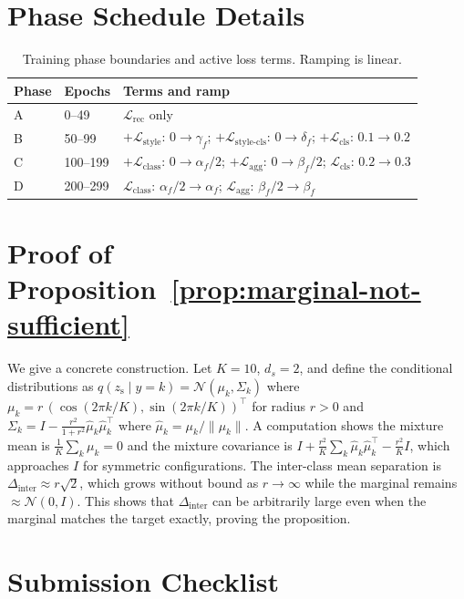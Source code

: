 \documentclass[10pt]{article}
\newcommand{\zs}{z_{\mathrm{s}}}
\begin{document}
\section{Phase Schedule Details}
\label{app:schedule}

\begin{table}[h]
\centering
\caption{Training phase boundaries and active loss terms. Ramping is linear.}
\label{tab:phases}
\begin{tabular}{lll}
\toprule
Phase & Epochs & Terms and ramp \\
\midrule
A & 0--49 &
  $\mathcal{L}_{\mathrm{rec}}$ only \\
B & 50--99 &
  $+\mathcal{L}_{\mathrm{style}}$: $0\to\gamma_f$;
  $+\mathcal{L}_{\mathrm{style\text{-}cls}}$: $0\to\delta_f$;
  $+\mathcal{L}_{\mathrm{cls}}$: $0.1\to0.2$ \\
C & 100--199 &
  $+\mathcal{L}_{\mathrm{class}}$: $0\to\alpha_f/2$;
  $+\mathcal{L}_{\mathrm{agg}}$: $0\to\beta_f/2$;
  $\mathcal{L}_{\mathrm{cls}}$: $0.2\to0.3$ \\
D & 200--299 &
  $\mathcal{L}_{\mathrm{class}}$: $\alpha_f/2\to\alpha_f$;
  $\mathcal{L}_{\mathrm{agg}}$: $\beta_f/2\to\beta_f$ \\
\bottomrule
\end{tabular}
\end{table}

\section{Proof of Proposition~\ref{prop:marginal-not-sufficient}}
\label{app:proof}

We give a concrete construction.
Let $K=10$, $d_s=2$, and define the conditional distributions as
$q(\zs\mid y{=}k) = \mathcal{N}(\mu_k, \Sigma_k)$ where
$\mu_k = r\,(\cos(2\pi k/K),\sin(2\pi k/K))^\top$ for radius $r>0$ and
$\Sigma_k = I - \frac{r^2}{1+r^2}\hat\mu_k\hat\mu_k^\top$ where
$\hat\mu_k = \mu_k/\|\mu_k\|$.
A computation shows the mixture mean is $\frac{1}{K}\sum_k\mu_k=0$ and the mixture
covariance is $I + \frac{r^2}{K}\sum_k\hat\mu_k\hat\mu_k^\top - \frac{r^2}{K}I$,
which approaches $I$ for symmetric configurations.
The inter-class mean separation is $\Delta_{\mathrm{inter}}\approx r\sqrt{2}$,
which grows without bound as $r\to\infty$ while the marginal remains
$\approx\mathcal{N}(0,I)$.
This shows that $\Delta_{\mathrm{inter}}$ can be arbitrarily large even when the
marginal matches the target exactly, proving the proposition.

\section{Submission Checklist}
\label{app:checklist}
\end{document}
